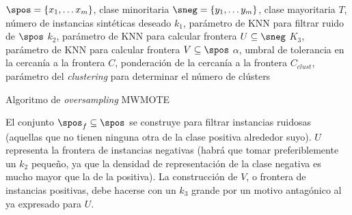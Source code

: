 \begin{algorithm}[H]
\begin{algorithmic}[1]
  \REQUIRE $\spos = \{x_1, \ldots x_m\}$, clase minoritaria
  \REQUIRE $\sneg = \{y_1, \ldots y_m\}$, clase mayoritaria
  \REQUIRE $T$, número de instancias sintéticas deseado
  \REQUIRE $k_{1}$, parámetro de KNN para filtrar ruido de $\spos$
  \REQUIRE $k_{2}$, parámetro de KNN para calcular frontera $U \subseteq \sneg$
  \REQUIRE $K_{3}$, parámetro de KNN para calcular frontera $V \subseteq \spos$
  \REQUIRE $\alpha$, umbral de tolerancia en la cercanía a la frontera
  \REQUIRE $C$, ponderación de la cercanía a la frontera
  \REQUIRE $C_{clust}$, parámetro del \textit{clustering} para determinar el número de clústers
  \NEWLINE
  \ENDFOR
  \NEWLINE
\end{algorithmic}
\caption{Algoritmo de \textit{oversampling} MWMOTE}
\label{alg:mwmote}
\end{algorithm}


El conjunto $\spos_f \subseteq \spos$ se construye para filtrar instancias ruidosas (aquellas que no tienen ninguna otra 
de la clase positiva alrededor suyo). $U$ representa la frontera de instancias negativas (habrá que tomar preferiblemente
un $k_2$ pequeño, ya que la densidad de representación de la clase negativa es mucho mayor que la de la positiva). La 
construcción de $V$, o frontera de instancias positivas, debe hacerse con un $k_3$ grande por un motivo antagónico al 
ya expresado para $U$.

